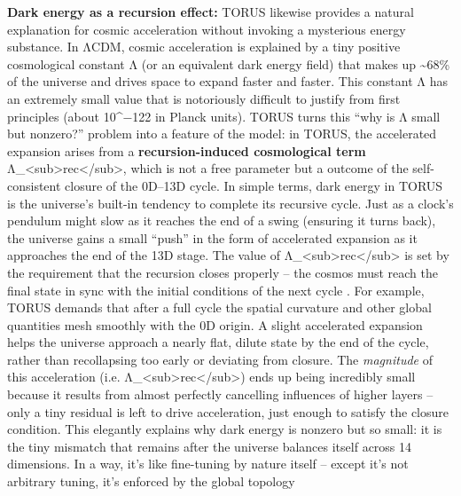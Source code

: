 \documentclass[
]{article}
\begin{document}
\textbf{Dark energy as a recursion effect:} TORUS likewise provides a
natural explanation for cosmic acceleration without invoking a
mysterious energy substance. In ΛCDM, cosmic acceleration is explained
by a tiny positive cosmological constant Λ (or an equivalent dark energy
field) that makes up \textasciitilde68\% of the universe and drives
space to expand faster and faster. This constant Λ has an extremely
small value that is notoriously difficult to justify from first
principles (about 10\^{}−122 in Planck units)\hspace{0pt}. TORUS turns
this ``why is Λ small but nonzero?'' problem into a feature of the
model: in TORUS, the accelerated expansion arises from a
\textbf{recursion-induced cosmological term}
Λ\_\textless sub\textgreater rec\textless/sub\textgreater, which is not
a free parameter but a outcome of the self-consistent closure of the
0D--13D cycle\hspace{0pt}. In simple terms, dark energy in TORUS is the
universe's built-in tendency to complete its recursive cycle. Just as a
clock's pendulum might slow as it reaches the end of a swing (ensuring
it turns back), the universe gains a small ``push'' in the form of
accelerated expansion as it approaches the end of the 13D stage. The
value of Λ\_\textless sub\textgreater rec\textless/sub\textgreater{} is
set by the requirement that the recursion closes properly -- the cosmos
must reach the final state in sync with the initial conditions of the
next cycle\hspace{0pt} \hspace{0pt}. For example, TORUS demands that
after a full cycle the spatial curvature and other global quantities
mesh smoothly with the 0D origin. A slight accelerated expansion helps
the universe approach a nearly flat, dilute state by the end of the
cycle, rather than recollapsing too early or deviating from
closure\hspace{0pt}. The \emph{magnitude} of this acceleration (i.e.
Λ\_\textless sub\textgreater rec\textless/sub\textgreater) ends up being
incredibly small because it results from almost perfectly cancelling
influences of higher layers -- only a tiny residual is left to drive
acceleration, just enough to satisfy the closure condition\hspace{0pt}.
This elegantly explains why dark energy is nonzero but so small: it is
the tiny mismatch that remains after the universe balances itself across
14 dimensions. In a way, it's like fine-tuning by nature itself --
except it's not arbitrary tuning, it's enforced by the global topology
\end{document}
